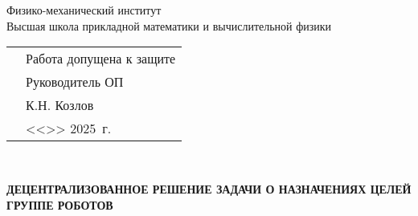 \thispagestyle{empty}%
\makeatletter
{}
%
\makeatother



{\centering%
	\Ministry\\
	\SPbPU\\
	{%
		Физико-механический институт\\
		Высшая школа прикладной математики и вычислительной физики}
\par}%


\vspace{0pt plus1fill} %



\noindent
\begin{minipage}{\linewidth}
	\vspace{\mfloatsep} %
	\begin{tabularx}{\linewidth}{Xl}
	&Работа допущена к защите     \\
	&Руководитель ОП     \\			
	&\underline{\hspace*{0.1\textheight}} К.Н. Козлов   \\
	&<<\underline{\hspace*{0.05\textheight}}>> \underline{\hspace*{0.1\textheight}} 
	2025~г.  \\ 
	\end{tabularx}
	\vspace{\mfloatsep} %
\end{minipage}


\vspace{0pt plus2fill} %


{\centering%
	
	\MakeUppercase{\bfseries{}\DocType} \\ 
	\MakeUppercase{\thesisDegree}%


{\centering%
	\MakeUppercase{\bfseries{ДЕЦЕНТРАЛИЗОВАННОЕ РЕШЕНИЕ ЗАДАЧИ О НАЗНАЧЕНИЯХ ЦЕЛЕЙ ГРУППЕ РОБОТОВ}}}%

}\par%

